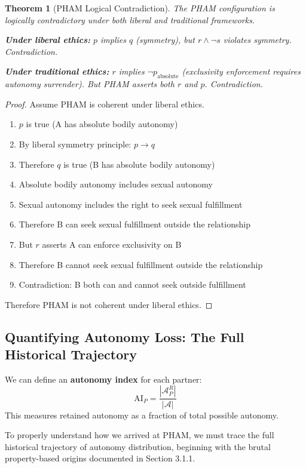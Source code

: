 \documentclass[12pt, letterpaper]{article}
\newtheorem{theorem}{Theorem}[section]
\begin{document}
\begin{theorem}[PHAM Logical Contradiction]
The PHAM configuration is logically contradictory under both liberal and traditional frameworks.

\textbf{Under liberal ethics:}
$p$ implies $q$ (symmetry), but $r \land \neg s$ violates symmetry. Contradiction.

\textbf{Under traditional ethics:}
$r$ implies $\neg p_{\text{absolute}}$ (exclusivity enforcement requires autonomy surrender). But PHAM asserts both $r$ and $p$. Contradiction.
\end{theorem}

\begin{proof}
Assume PHAM is coherent under liberal ethics.
\begin{enumerate}
    \item $p$ is true (A has absolute bodily autonomy)
    \item By liberal symmetry principle: $p \rightarrow q$
    \item Therefore $q$ is true (B has absolute bodily autonomy)
    \item Absolute bodily autonomy includes sexual autonomy
    \item Sexual autonomy includes the right to seek sexual fulfillment
    \item Therefore B can seek sexual fulfillment outside the relationship
    \item But $r$ asserts A can enforce exclusivity on B
    \item Therefore B cannot seek sexual fulfillment outside the relationship
    \item Contradiction: B both can and cannot seek outside fulfillment
\end{enumerate}
Therefore PHAM is not coherent under liberal ethics.
\renewcommand{\qedsymbol}{}
\end{proof}

\subsection{Quantifying Autonomy Loss: The Full Historical Trajectory}

We can define an \textbf{autonomy index} for each partner:
\[
\text{AI}_P = \frac{|\mathcal{A}_P^R|}{|\mathcal{A}|}
\]
This measures retained autonomy as a fraction of total possible autonomy.

To properly understand how we arrived at PHAM, we must trace the full historical trajectory of autonomy distribution, beginning with the brutal property-based origins documented in Section 3.1.1.
\end{document}
